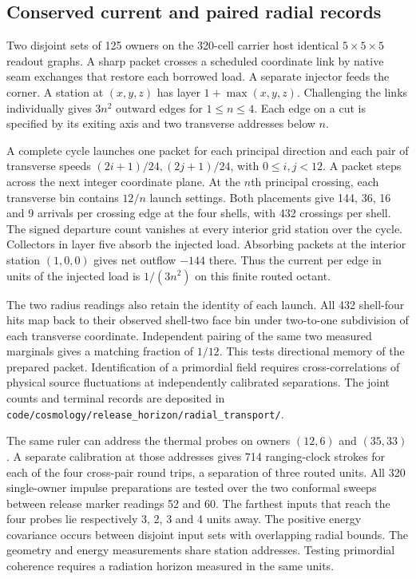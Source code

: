 \documentclass[11pt]{article}
\newcommand{\pathref}[1]{\nolinkurl{#1}}
\theoremstyle{remark}
\begin{document}
\subsection{Conserved current and paired radial records}
Two disjoint sets of 125 owners on the 320-cell carrier host identical
\(5\times5\times5\) readout graphs. A sharp packet crosses a scheduled
coordinate link by native seam exchanges that restore each borrowed load.
A separate injector feeds the corner. A station at \((x,y,z)\) has
layer \(1+\max(x,y,z)\). Challenging the links individually gives
\(3n^2\) outward edges for \(1\leq n\leq4\). Each edge on a cut is
specified by its exiting axis and two transverse addresses below \(n\).

A complete cycle launches one packet for each principal direction and
each pair of transverse speeds \((2i+1)/24,(2j+1)/24\), with
\(0\leq i,j<12\). A packet steps across the next integer coordinate
plane. At the \(n\)th principal crossing, each transverse bin contains
\(12/n\) launch settings. Both placements give 144, 36, 16 and 9 arrivals
per crossing edge at the four shells, with 432 crossings per shell.
The signed departure count vanishes at every interior grid station over
the cycle. Collectors in layer five absorb the injected load. Absorbing
packets at the interior station \((1,0,0)\) gives net outflow \(-144\)
there. Thus the current per edge in units of the injected load is
\(1/(3n^2)\) on this finite routed octant.

The two radius readings also retain the identity of each launch.
All 432 shell-four hits map back to their observed shell-two face bin
under two-to-one subdivision of each transverse coordinate. Independent
pairing of the same two measured marginals gives a matching fraction
of \(1/12\). This tests directional memory of the prepared packet.
Identification of a primordial field requires cross-correlations of
physical source fluctuations at independently calibrated separations.
The joint counts and terminal records are deposited in
\newline\mbox{\pathref{code/cosmology/release_horizon/radial_transport/}}.

The same ruler can address the thermal probes on owners \((12,6)\)
and \((35,33)\). A separate calibration at those addresses gives 714
ranging-clock strokes for each of the four cross-pair round trips,
a separation of three routed units. All 320 single-owner impulse
preparations are tested over the two conformal sweeps between release
marker readings 52 and 60. The farthest inputs that reach the four
probes lie respectively 3, 2, 3 and 4 units away. The positive energy covariance occurs between disjoint input sets
with overlapping radial bounds. The geometry and energy measurements
share station addresses. Testing primordial coherence requires a
radiation horizon measured in the same units.
\end{document}
